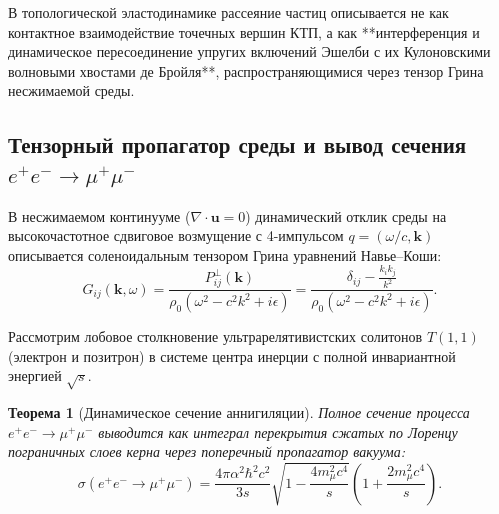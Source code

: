 \documentclass[12pt,a4paper]{article}
\newtheorem{theorem}{Теорема}
\begin{document}
	В топологической эластодинамике рассеяние частиц описывается не как контактное взаимодействие точечных вершин КТП, а как **интерференция и динамическое пересоединение упругих включений Эшелби с их Кулоновскими волновыми хвостами де Бройля**, распространяющимися через тензор Грина несжимаемой среды.
	
	\subsection{Тензорный пропагатор среды и вывод сечения $e^+ e^- \to \mu^+ \mu^-$}
	В несжимаемом континууме ($\nabla \cdot \mathbf{u} = 0$) динамический отклик среды на высокочастотное сдвиговое возмущение с 4-импульсом $q = (\omega/c, \mathbf{k})$ описывается соленоидальным тензором Грина уравнений Навье--Коши:
	\begin{equation}
		G_{ij}(\mathbf{k}, \omega) = \frac{P_{ij}^\perp(\mathbf{k})}{\rho_0 (\omega^2 - c^2 k^2 + i\epsilon)} = \frac{\delta_{ij} - \frac{k_i k_j}{k^2}}{\rho_0 (\omega^2 - c^2 k^2 + i\epsilon)}.
	\end{equation}
	
	Рассмотрим лобовое столкновение ультрарелятивистских солитонов $T(1,1)$ (электрон и позитрон) в системе центра инерции с полной инвариантной энергией $\sqrt{s}$.
	
	\begin{theorem}[Динамическое сечение аннигиляции]
		Полное сечение процесса $e^+ e^- \to \mu^+ \mu^-$ выводится как интеграл перекрытия сжатых по Лоренцу пограничных слоев керна через поперечный пропагатор вакуума:
		\begin{equation}
			\sigma(e^+ e^- \to \mu^+ \mu^-) = \frac{4\pi \alpha^2 \hbar^2 c^2}{3s} \sqrt{1 - \frac{4m_\mu^2 c^4}{s}} \left( 1 + \frac{2m_\mu^2 c^4}{s} \right).
		\end{equation}
	\end{theorem}
	
\end{document}
